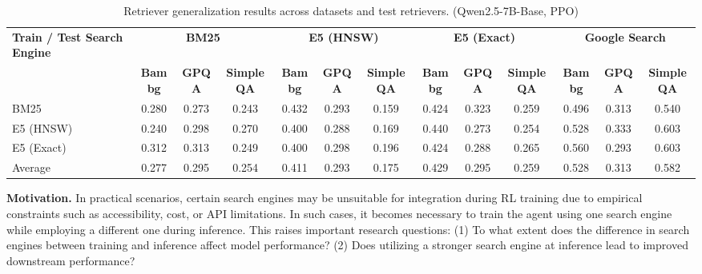 \begin{table}[t]
    \centering
    \scriptsize
    \setlength{\tabcolsep}{1pt}
    
    \caption{Retriever generalization results across datasets and test retrievers. (Qwen2.5-7B-Base, PPO)}\label{tab:retriever-generalization}
    \begin{tabular}{lcccccccccccc}
        \toprule
        \textbf{Train / Test Search Engine} & \multicolumn{3}{c}{\textbf{BM25}} & \multicolumn{3}{c}{\textbf{E5 (HNSW)}} & \multicolumn{3}{c}{\textbf{E5 (Exact)}} & \multicolumn{3}{c}{\textbf{Google Search}} \\
        \cmidrule(lr){2-4} \cmidrule(lr){5-7} \cmidrule(lr){8-10} \cmidrule(lr){11-13}
         & \textbf{Bambg} & \textbf{GPQA} & \textbf{SimpleQA} & \textbf{Bambg} & \textbf{GPQA} & \textbf{SimpleQA} & \textbf{Bambg} & \textbf{GPQA} & \textbf{SimpleQA} & \textbf{Bambg} & \textbf{GPQA} & \textbf{SimpleQA} \\
        \midrule
        
        BM25 & 0.280 & 0.273 & 0.243 & 0.432 & 0.293 & 0.159 & 0.424 & 0.323 & 0.259 & 0.496 & 0.313 & 0.540 \\
        E5 (HNSW) & 0.240 & 0.298 & 0.270 & 0.400 & 0.288 & 0.169 & 0.440 & 0.273 & 0.254 & 0.528 & 0.333 & 0.603 \\
        E5 (Exact) & 0.312 & 0.313 & 0.249 & 0.400 & 0.298 & 0.196 & 0.424 & 0.288 & 0.265 & 0.560 & 0.293 & 0.603 \\
        \midrule
        Average & 0.277 & 0.295 & 0.254 & 0.411 & 0.293 & 0.175 & 0.429 & 0.295 & 0.259 & 0.528 & 0.313 & 0.582   \\
        \bottomrule
    \end{tabular}
    
\end{table}

\textbf{Motivation.}
In practical scenarios, certain search engines may be unsuitable for integration during RL training due to empirical constraints such as accessibility, cost, or API limitations. 
In such cases, it becomes necessary to train the agent using one search engine while employing a different one during inference. 
This raises important research questions: (1) To what extent does the difference in search engines between training and inference affect model performance? (2) Does utilizing a stronger search engine at inference lead to improved downstream performance?

